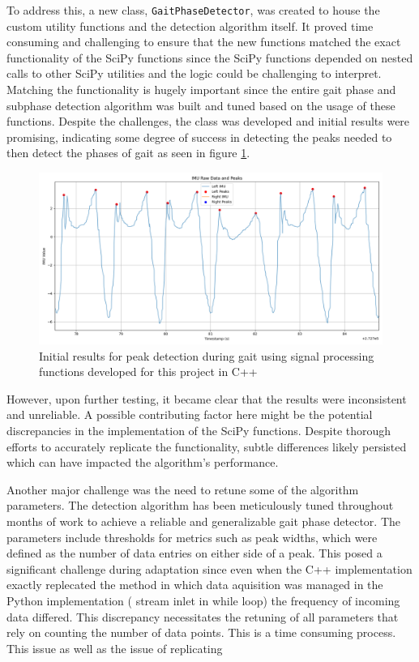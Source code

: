 To address this, a new class, \texttt{GaitPhaseDetector}, was created to house the custom utility functions and the detection algorithm itself. It proved time consuming and challenging to ensure that the new functions matched the exact functionality of the SciPy functions since the SciPy functions depended on nested calls to other SciPy utilities and the logic could be challenging to interpret. Matching the functionality is hugely important since the entire gait phase and subphase detection algorithm was built and tuned based on the usage of these functions. Despite the challenges, the class was developed and initial results were promising, indicating some degree of success in detecting the peaks needed to then detect the phases of gait as seen in figure \ref{fig:peaks}. 

\begin{figure}
    \centering
    \includegraphics[width=0.95\linewidth]{images/peaks_wz_13.12.24.png}
    \caption{Initial results for peak detection during gait using signal processing functions developed for this project in C++}
    \label{fig:peaks}
\end{figure}

However, upon further testing, it became clear that the results were inconsistent and unreliable. A possible contributing factor here might be the potential discrepancies in the implementation of the SciPy functions. Despite thorough efforts to accurately replicate the functionality, subtle differences likely persisted which can have impacted the algorithm's performance. 

Another major challenge was the need to retune some of the algorithm parameters. The detection algorithm has been meticulously tuned throughout months of work to achieve a reliable and generalizable gait phase detector. The parameters include thresholds for metrics such as peak widths, which were defined as the number of data entries on either side of a peak. This posed  a significant challenge during adaptation since even when the C++ implementation exactly replecated the method in which data aquisition was managed in the Python implementation ( stream inlet in while loop) the frequency of incoming data differed. This discrepancy necessitates the retuning of all parameters that rely on counting the number of data points. This is a time consuming process. This issue as well as the issue of replicating 

